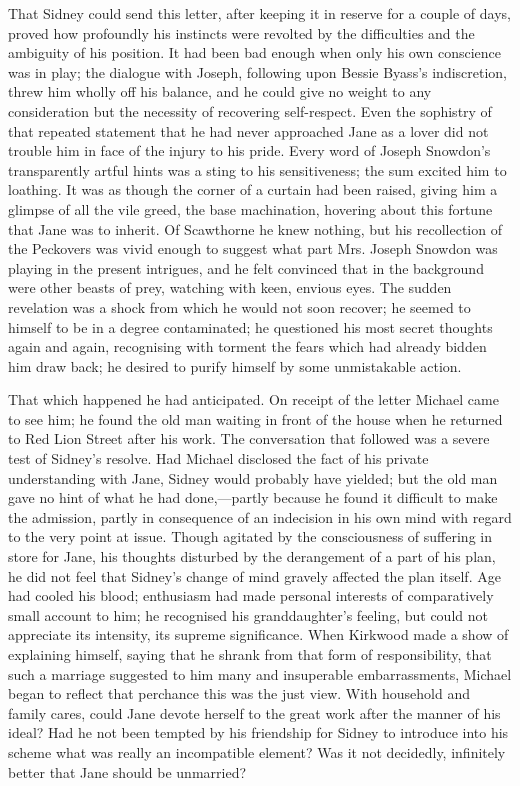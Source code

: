 That Sidney could send this letter, after keeping it in reserve for a
couple of days, proved how profoundly his instincts were revolted by the
difficulties and the ambiguity of his position. It had been bad enough
when only his own conscience was in play; the dialogue with Joseph,
following upon Bessie Byass's indiscretion, threw him wholly off his
balance, and he could give no weight to any consideration but the
necessity of recovering self-respect. Even the sophistry of that
repeated statement that he had never approached Jane as a lover did not
trouble him in face of the injury to his pride. Every
{\protect\hypertarget{17}{}{}}word of Joseph Snowdon's transparently
artful hints was a sting to his sensitiveness; the sum excited him to
loathing. It was as though the corner of a curtain had been raised,
giving him a glimpse of all the vile greed, the base machination,
hovering about this fortune that Jane was to inherit. Of Scawthorne he
knew nothing, but his recollection of the Peckovers was vivid enough to
suggest what part Mrs. Joseph Snowdon was playing in the present
intrigues, and he felt convinced that in the background were other
beasts of prey, watching with keen, envious eyes. The sudden revelation
was a shock from which he would not soon recover; he seemed to himself
to be in a degree contaminated; he questioned his most secret thoughts
again and again, recognising with torment the fears which had already
bidden him draw back; he desired to purify himself by some unmistakable
action.

That which happened he had anticipated. On receipt of the letter Michael
came to see him; he found the old man waiting in front of the house when
he returned to Red Lion Street after his work. The conversation that
followed {\protect\hypertarget{18}{}{}}was a severe test of Sidney's
resolve. Had Michael disclosed the fact of his private understanding
with Jane, Sidney would probably have yielded; but the old man gave no
hint of what he had done,---partly because he found it difficult to make
the admission, partly in consequence of an indecision in his own mind
with regard to the very point at issue. Though agitated by the
consciousness of suffering in store for Jane, his thoughts disturbed by
the derangement of a part of his plan, he did not feel that Sidney's
change of mind gravely affected the plan itself. Age had cooled his
blood; enthusiasm had made personal interests of comparatively small
account to him; he recognised his granddaughter's feeling, but could not
appreciate its intensity, its supreme significance. When Kirkwood made a
show of explaining himself, saying that he shrank from that form of
responsibility, that such a marriage suggested to him many and
insuperable embarrassments, Michael began to reflect that perchance this
was the just view. With household and family cares, could Jane devote
herself to the great work after the manner of his ideal? Had he not been
tempted by {\protect\hypertarget{19}{}{}}his friendship for Sidney to
introduce into his scheme what was really an incompatible element? Was
it not decidedly, infinitely better that Jane should be unmarried?

